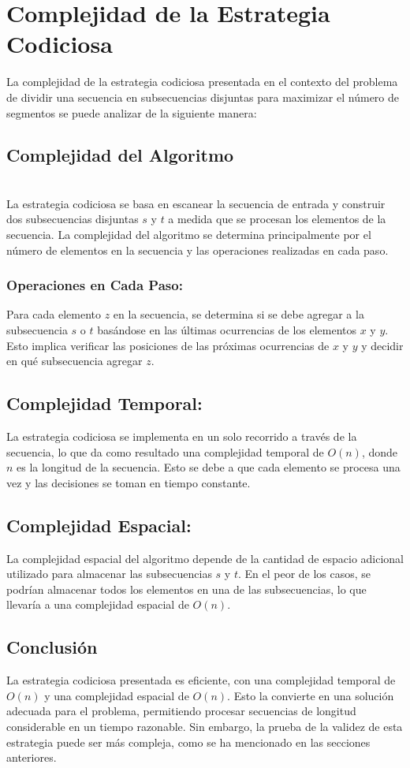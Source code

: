 \documentclass{article}
\begin{document}
\section{Complejidad de la Estrategia Codiciosa}

La complejidad de la estrategia codiciosa presentada en el contexto del problema de dividir una secuencia en subsecuencias disjuntas para maximizar el número de segmentos se puede analizar de la siguiente manera:

\subsection{Complejidad del Algoritmo}\\

   La estrategia codiciosa se basa en escanear la secuencia de entrada y construir dos subsecuencias disjuntas $s$ y $t$ a medida que se procesan los elementos de la secuencia. La complejidad del algoritmo se determina principalmente por el número de elementos en la secuencia y las operaciones realizadas en cada paso.

\subsubsection{Operaciones en Cada Paso:}
   Para cada elemento $z$ en la secuencia, se determina si se debe agregar a la subsecuencia $s$ o $t$ basándose en las últimas ocurrencias de los elementos $x$ y $y$. Esto implica verificar las posiciones de las próximas ocurrencias de $x$ y $y$ y decidir en qué subsecuencia agregar $z$.

\subsection{Complejidad Temporal:}
   La estrategia codiciosa se implementa en un solo recorrido a través de la secuencia, lo que da como resultado una complejidad temporal de $O(n)$, donde $n$ es la longitud de la secuencia. Esto se debe a que cada elemento se procesa una vez y las decisiones se toman en tiempo constante.

\subsection{Complejidad Espacial:}
   La complejidad espacial del algoritmo depende de la cantidad de espacio adicional utilizado para almacenar las subsecuencias $s$ y $t$. En el peor de los casos, se podrían almacenar todos los elementos en una de las subsecuencias, lo que llevaría a una complejidad espacial de $O(n)$.

\subsection{Conclusión}

La estrategia codiciosa presentada es eficiente, con una complejidad temporal de $O(n)$ y una complejidad espacial de $O(n)$. Esto la convierte en una solución adecuada para el problema, permitiendo procesar secuencias de longitud considerable en un tiempo razonable. Sin embargo, la prueba de la validez de esta estrategia puede ser más compleja, como se ha mencionado en las secciones anteriores.
\end{document}
